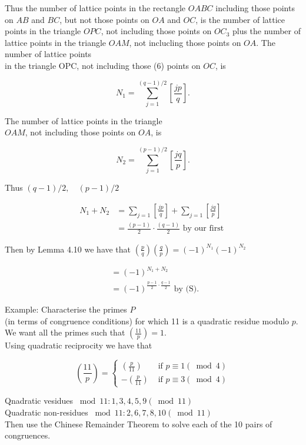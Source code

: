 \documentclass[10pt]{article}
\begin{document}
Thus the number of lattice points in the rectangle $O A B C$ including those points on $A B$ and $B C$, but not those points on $O A$ and $O C$, is the number of lattice points in the triangle $O P C$, not including those points on $O C_{3}$ plus the number of lattice points in the triangle $O A M$, not inclucling those points on $O A$. The number of lattice points\\
in the triangle OPC, not including those (6) points on $O C$, is

$$
N_{1}=\sum_{j=1}^{(q-1) / 2}\left[\frac{j p}{q}\right] .
$$

The number of lattice points in the triangle\\
$O A M$, not including those points on $O A$, is

$$
N_{2}=\sum_{j=1}^{(p-1) / 2}\left[\frac{j q}{p}\right] .
$$

Thus $(q-1) / 2, \quad(p-1) / 2$


\begin{align*}
N_{1}+N_{2} & =\sum_{j=1}\left[\frac{j p}{q}\right]+\sum_{j=1}\left[\frac{j q}{p}\right] \\
& =\frac{(p-1)}{2} \cdot \frac{(q-1)}{2} \text { by our first } \tag{5}
\end{align*}


Then by Lemma 4.10 we have that $\left(\frac{p}{q}\right)\left(\frac{q}{p}\right)=(-1)^{N_{1}}(-1)^{N_{2}}$

$$
\begin{aligned}
& =(-1)^{N_{1}+N_{2}} \\
& =(-1)^{\frac{p-1}{2} \cdot \frac{q-1}{2}} \text { by (S). }
\end{aligned}
$$

Example: Characterise the primes $P$\\
(in terms of congruence conditions) for which 11 is a quadratic residue modulo $p$.\\
We want all the primes such that $\left(\frac{11}{p}\right)=1$.\\
Using quadratic reciprocity we have that

$$
\left(\frac{11}{p}\right)= \begin{cases}\left(\frac{p}{11}\right) & \text { if } p \equiv 1(\bmod 4) \\ -\left(\frac{p}{11}\right) & \text { if } p \equiv 3(\bmod 4)\end{cases}
$$

Qnadratic vesidues $\bmod 11: 1,3,4,5,9(\bmod 11)$\\
Quadratic non-residues $\bmod 11: 2,6,7,8,10(\bmod 11)$\\
Then use the Chinese Remainder Theorem to solve each of the 10 pairs of congruences.
\end{document}
